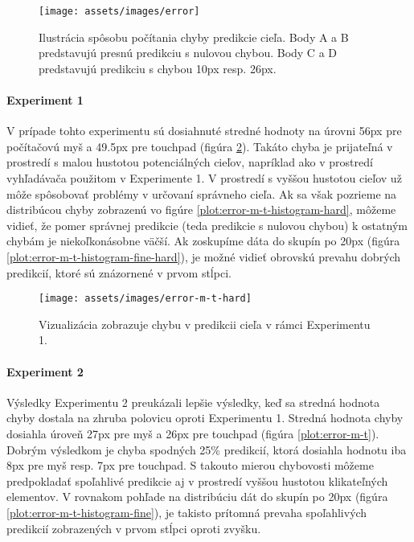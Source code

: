 \begin{figure}[h]
\centering
\texttt{[image: assets/images/error]}
\caption{Ilustrácia spôsobu počítania chyby predikcie cieľa. Body A a B predstavujú presnú predikciu s nulovou chybou. Body C a D predstavujú predikciu s chybou 10px resp. 26px. \label{fig:error}}
\end{figure}

\paragraph{Experiment 1}
V prípade tohto experimentu sú dosiahnuté stredné hodnoty na úrovni 56px pre počítačovú myš a 49.5px pre touchpad (figúra \ref{plot:error-m-t-hard}). Takáto chyba je prijateľná v prostredí s malou hustotou potenciálných cieľov, napríklad ako v prostredí vyhľadávača použitom v Experimente 1. V prostredí s vyššou hustotou cieľov už môže spôsobovať problémy v určovaní správneho cieľa. Ak sa však pozrieme na distribúcou chyby zobrazenú vo figúre \ref{plot:error-m-t-histogram-hard}, môžeme vidieť, že pomer správnej predikcie (teda predikcie s nulovou chybou) k ostatným chybám je niekoľkonásobne väčší. Ak zoskupíme dáta do skupín po 20px (figúra \ref{plot:error-m-t-histogram-fine-hard}), je možné vidieť obrovskú prevahu dobrých predikcií, ktoré sú znázornené v prvom stĺpci.

\begin{figure}[h]
\centering
\texttt{[image: assets/images/error-m-t-hard]}
\caption{Vizualizácia zobrazuje chybu v predikcii cieľa v rámci Experimentu 1.  \label{plot:error-m-t-hard}}
\end{figure}

\paragraph{Experiment 2}
Výsledky Experimentu 2 preukázali lepšie výsledky, keď sa stredná hodnota chyby dostala na zhruba polovicu oproti Experimentu 1. Stredná hodnota chyby dosiahla úroveň 27px pre myš a 26px pre touchpad (figúra \ref{plot:error-m-t}). Dobrým výsledkom je chyba spodných 25\% predikcií, ktorá dosiahla hodnotu iba 8px pre myš resp. 7px pre touchpad. S takouto mierou chybovosti môžeme predpokladať spoľahlivé predikcie aj v prostredí vyššou hustotou klikateľných elementov. V rovnakom pohľade na distribúciu dát do skupín po 20px (figúra \ref{plot:error-m-t-histogram-fine}), je takisto prítomná prevaha spoľahlivých predikcií zobrazených v prvom stĺpci oproti zvyšku.

